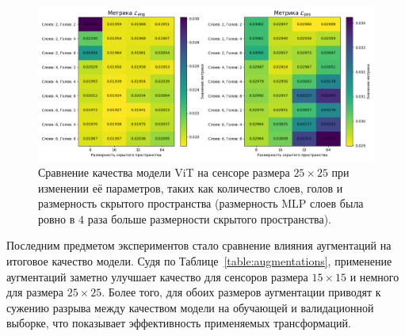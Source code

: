 \documentclass[a4paper,12pt]{extarticle}
\begin{document}
\begin{figure}[t]
    \centering
    \includegraphics[width=1.0\textwidth]{graphics/exp4_model_params.png}
    \caption{Сравнение качества модели \textsf{ViT} на сенсоре размера $25 \times 25$ при изменении её параметров, таких как количество слоев, голов и размерность скрытого пространства (размерность MLP слоев была ровно в $4$ раза больше размерности скрытого пространства).}
    \label{graph:model_params}
\end{figure}

Последним предметом экспериментов стало сравнение влияния аугментаций на итоговое качество модели. Судя по Таблице~\ref{table:augmentations}, применение аугментаций заметно улучшает качество для сенсоров размера $15 \times 15$ и немного для размера $25 \times 25$. Более того, для обоих размеров аугментации приводят к сужению разрыва между качеством модели на обучающей и валидационной выборке, что показывает эффективность применяемых трансформаций.
\end{document}
